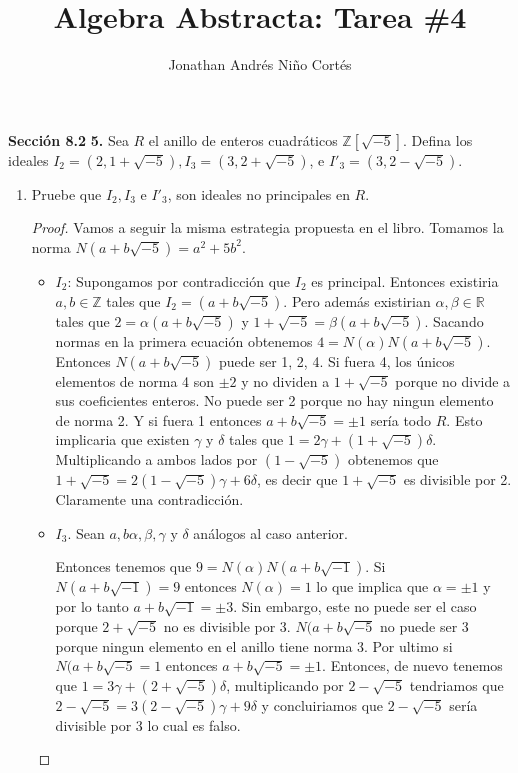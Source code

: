 \documentclass[letter,twoside,12pt]{article}
\title{Algebra Abstracta: Tarea \#4}
\author{Jonathan Andrés Niño Cortés}
\begin{document}
\maketitle
\textbf{Sección 8.2} \textbf{5.} Sea $ R $ el anillo de enteros cuadráticos $ \mathbb{Z}[\sqrt{-5}] $. Defina los ideales $ I_2 = (2,1+\sqrt{-5}), I_3 = (3,2+\sqrt{-5})$, e $I'_3=(3,2-\sqrt{-5}) $. 
\begin{enumerate}[label=\textbf{(\alph*)}]
\item Pruebe que $ I_2, I_3 $ e $ I'_3 $, son ideales no principales en $ R $.

\begin{proof}
Vamos a seguir la misma estrategia propuesta en el libro. Tomamos la norma $ N(a+b\sqrt{-5})=a^2+5b^2 $.
\begin{itemize}
\item $ I_2 $: Supongamos por contradicción que $ I_2 $ es principal. Entonces existiria $ a,b \in \mathbb{Z} $ tales que $ I_2=(a+b\sqrt{-5}) $. Pero además existirian $\alpha,\beta \in \mathbb{R}$ tales que $ 2=\alpha(a+b\sqrt{-5}) $ y $ 1+\sqrt{-5}=\beta(a+b\sqrt{-5}) $. Sacando normas en la primera ecuación obtenemos $ 4=N(\alpha)N(a+b\sqrt{-5}) $. Entonces $ N(a+b\sqrt{-5}) $ puede ser 1, 2, 4. Si fuera 4, los únicos elementos de norma 4 son  $ \pm2 $ y no dividen a $ 1+\sqrt{-5} $ porque no divide a sus coeficientes enteros. No puede ser 2 porque no hay ningun elemento de norma 2. Y si fuera 1 entonces $ a+b\sqrt{-5} = \pm 1 $ sería todo $ R $. Esto implicaria que existen $ \gamma $ y $ \delta $ tales que $ 1 = 2\gamma+(1+\sqrt{-5})\delta$. Multiplicando a ambos lados por $ (1-\sqrt{-5}) $ obtenemos que $ 1+\sqrt{-5}=2 (1-\sqrt{-5})\gamma + 6\delta$, es decir que  $1+\sqrt{-5}$ es divisible por 2. Claramente una contradicción.

\item $ I_3 $. Sean $ a,b \alpha, \beta, \gamma $ y $\delta$ análogos al caso anterior.

Entonces tenemos que $ 9 = N(\alpha)N(a+b\sqrt{-1}) $. Si $ N(a+b\sqrt{-1})  = 9$ entonces $ N(\alpha)=1 $ lo que implica que $ \alpha=\pm1 $ y por lo tanto $ a+b\sqrt{-1} = \pm3 $. Sin embargo, este no puede ser el caso porque $ 2+\sqrt{-5} $ no es divisible por 3. $ N(a+b\sqrt{-5}  $  no puede ser 3 porque ningun elemento en el anillo tiene norma 3. Por ultimo  si $ N(a+b\sqrt{-5}=1 $ entonces $ a+b\sqrt{-5}= \pm1 $. Entonces, de nuevo tenemos que $ 1 = 3\gamma+(2+\sqrt{-5})\delta $, multiplicando por $ 2-\sqrt{-5} $ tendriamos que $ 2-\sqrt{-5} = 3(2-\sqrt{-5})\gamma+9\delta $ y concluiriamos que $ 2-\sqrt{-5} $ sería divisible por 3 lo cual es falso.


\end{itemize}
\end{proof}
\end{enumerate}
\end{document}
